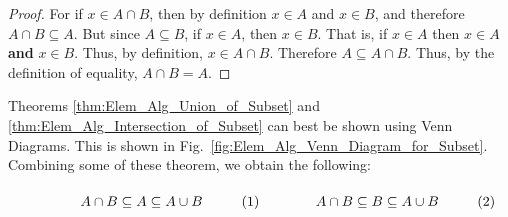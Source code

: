 \documentclass[crop=false,class=book,oneside]{standalone}
\begin{document}
            \begin{proof}
                For if $x\in{A}\cap{B}$, then by
                definition $x\in{A}$ and $x\in{B}$,
                and therefore ${A}\cap{B}\subseteq{A}$.
                But since $A\subseteq{B}$, if
                $x\in{A}$, then $x\in{B}$. That is, if
                $x\in{A}$ then $x\in{A}$ \textbf{and} $x\in{B}$.
                Thus, by definition, $x\in{A}\cap{B}$.
                Therefore $A\subseteq{A}\cap{B}$. Thus, by
                the definition of equality,
                $A\cap{B}=A$.
            \end{proof}
            Theorems \ref{thm:Elem_Alg_Union_of_Subset} and
            \ref{thm:Elem_Alg_Intersection_of_Subset} can best
            be shown using Venn Diagrams. This is shown
            in Fig.~\ref{fig:Elem_Alg_Venn_Diagram_for_Subset}.
            Combining some of these theorem, we obtain the
            following:
            \par
            \vspace{1ex}
            \begin{subequations}
                \begin{minipage}{0.49\textwidth}
                    \begin{equation}
                        A\cap{B}\subseteq{A}\subseteq{A}\cup{B}
                    \end{equation}
                \end{minipage}
                \hfill
                \begin{minipage}{0.49\textwidth}
                    \begin{equation}
                        A\cap{B}\subseteq{B}\subseteq{A}\cup{B}
                    \end{equation}
                \end{minipage}
            \end{subequations}
            \par
\end{document}

